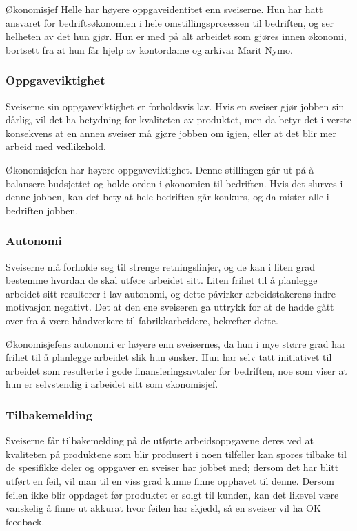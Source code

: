 Økonomisjef Helle har høyere oppgaveidentitet enn sveiserne. Hun har hatt ansvaret for bedriftsøkonomien i hele omstillingsprosessen til bedriften, og ser helheten av det hun gjør. Hun er med på alt arbeidet som gjøres innen økonomi, bortsett fra at hun får hjelp av kontordame og arkivar Marit Nymo.

\subsubsection{Oppgaveviktighet}
Sveiserne sin oppgaveviktighet er forholdsvis lav. Hvis en sveiser gjør jobben sin dårlig, vil det ha betydning for kvaliteten av produktet, men da betyr det i verste konsekvens at en annen sveiser må gjøre jobben om igjen, eller at det blir mer arbeid med vedlikehold.

Økonomisjefen har høyere oppgaveviktighet. Denne stillingen går ut på å balansere budsjettet og holde orden i økonomien til bedriften. Hvis det slurves i denne jobben, kan det bety at hele bedriften går konkurs, og da mister alle i bedriften jobben.

\subsubsection{Autonomi}
Sveiserne må forholde seg til strenge retningslinjer, og de kan i liten grad bestemme hvordan de skal utføre arbeidet sitt. Liten frihet til å planlegge arbeidet sitt resulterer i lav autonomi, og dette påvirker arbeidstakerens indre motivasjon negativt. Det at den ene sveiseren ga uttrykk for at de hadde gått over fra å være håndverkere til fabrikkarbeidere, bekrefter dette.

Økonomisjefens autonomi er høyere enn sveisernes, da hun i mye større grad har frihet til å planlegge arbeidet slik hun ønsker. Hun har selv tatt initiativet til arbeidet som resulterte i gode finansieringsavtaler for bedriften, noe som viser at hun er selvstendig i arbeidet sitt som økonomisjef.

\subsubsection{Tilbakemelding}
Sveiserne får tilbakemelding på de utførte arbeidsoppgavene deres ved at kvaliteten på produktene som blir produsert i noen tilfeller kan spores tilbake til de spesifikke deler og oppgaver en sveiser har jobbet med; dersom det har blitt utført en feil, vil man til en viss grad kunne finne opphavet til denne. Dersom feilen ikke blir oppdaget før produktet er solgt til kunden, kan det likevel være vanskelig å finne ut akkurat hvor feilen har skjedd, så en sveiser vil ha OK feedback.

